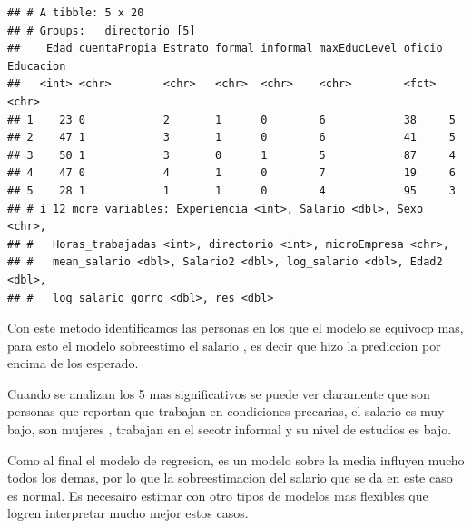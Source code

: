 \documentclass[
]{article}
\newenvironment{Shaded}{\begin{snugshade}}{\end{snugshade}}
\newcommand{\AttributeTok}[1]{\textcolor[rgb]{0.13,0.29,0.53}{#1}}
\newcommand{\DecValTok}[1]{\textcolor[rgb]{0.00,0.00,0.81}{#1}}
\newcommand{\FloatTok}[1]{\textcolor[rgb]{0.00,0.00,0.81}{#1}}
\newcommand{\FunctionTok}[1]{\textcolor[rgb]{0.13,0.29,0.53}{\textbf{#1}}}
\newcommand{\NormalTok}[1]{#1}
\newcommand{\OtherTok}[1]{\textcolor[rgb]{0.56,0.35,0.01}{#1}}
\newcommand{\SpecialCharTok}[1]{\textcolor[rgb]{0.81,0.36,0.00}{\textbf{#1}}}
\begin{document}
\begin{Shaded}
\end{Shaded}

\begin{verbatim}
## # A tibble: 5 x 20
## # Groups:   directorio [5]
##    Edad cuentaPropia Estrato formal informal maxEducLevel oficio Educacion
##   <int> <chr>        <chr>   <chr>  <chr>    <chr>        <fct>  <chr>    
## 1    23 0            2       1      0        6            38     5        
## 2    47 1            3       1      0        6            41     5        
## 3    50 1            3       0      1        5            87     4        
## 4    47 0            4       1      0        7            19     6        
## 5    28 1            1       1      0        4            95     3        
## # i 12 more variables: Experiencia <int>, Salario <dbl>, Sexo <chr>,
## #   Horas_trabajadas <int>, directorio <int>, microEmpresa <chr>,
## #   mean_salario <dbl>, Salario2 <dbl>, log_salario <dbl>, Edad2 <dbl>,
## #   log_salario_gorro <dbl>, res <dbl>
\end{verbatim}

Con este metodo identificamos las personas en los que el modelo se
equivocp mas, para esto el modelo sobreestimo el salario , es decir que
hizo la prediccion por encima de los esperado.

Cuando se analizan los 5 mas significativos se puede ver claramente que
son personas que reportan que trabajan en condiciones precarias, el
salario es muy bajo, son mujeres , trabajan en el secotr informal y su
nivel de estudios es bajo.

Como al final el modelo de regresion, es un modelo sobre la media
influyen mucho todos los demas, por lo que la sobreestimacion del
salario que se da en este caso es normal. Es necesairo estimar con otro
tipos de modelos mas flexibles que logren interpretar mucho mejor estos
casos.
\end{document}
